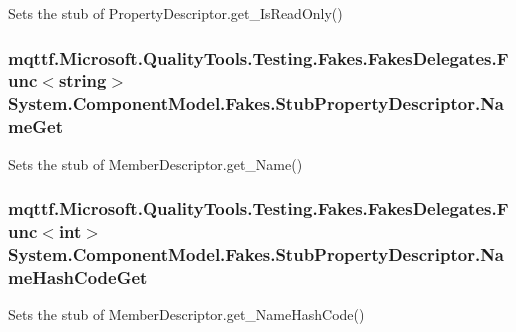 Sets the stub of Property\-Descriptor.\-get\-\_\-\-Is\-Read\-Only()

\hypertarget{class_system_1_1_component_model_1_1_fakes_1_1_stub_property_descriptor_a5d655b0472946c983fef56831bf11025}{
\subsubsection[{Name\-Get}]{\setlength{\rightskip}{0pt plus 5cm}mqttf.\-Microsoft.\-Quality\-Tools.\-Testing.\-Fakes.\-Fakes\-Delegates.\-Func$<$string$>$ System.\-Component\-Model.\-Fakes.\-Stub\-Property\-Descriptor.\-Name\-Get}}\label{class_system_1_1_component_model_1_1_fakes_1_1_stub_property_descriptor_a5d655b0472946c983fef56831bf11025}


Sets the stub of Member\-Descriptor.\-get\-\_\-\-Name()

\hypertarget{class_system_1_1_component_model_1_1_fakes_1_1_stub_property_descriptor_a4f3ae763ab9da7df301f635151976bb6}{
\subsubsection[{Name\-Hash\-Code\-Get}]{\setlength{\rightskip}{0pt plus 5cm}mqttf.\-Microsoft.\-Quality\-Tools.\-Testing.\-Fakes.\-Fakes\-Delegates.\-Func$<$int$>$ System.\-Component\-Model.\-Fakes.\-Stub\-Property\-Descriptor.\-Name\-Hash\-Code\-Get}}\label{class_system_1_1_component_model_1_1_fakes_1_1_stub_property_descriptor_a4f3ae763ab9da7df301f635151976bb6}


Sets the stub of Member\-Descriptor.\-get\-\_\-\-Name\-Hash\-Code()

